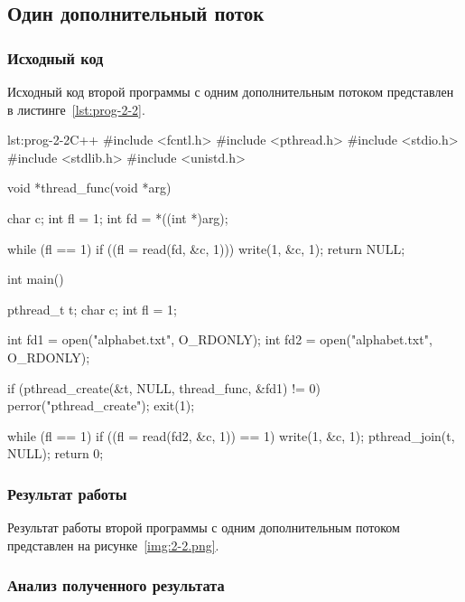 \subsection{Один дополнительный поток}
\subsubsection{Исходный код}
Исходный код второй программы с одним дополнительным потоком 
представлен в листинге~\ref{lst:prog-2-2}.

\begin{listing}{lst:prog-2-2}{C++}
#include <fcntl.h>
#include <pthread.h>
#include <stdio.h>
#include <stdlib.h>
#include <unistd.h>

void *thread_func(void *arg)
{
    char c;
    int fl = 1;
    int fd = *((int *)arg);

    while (fl == 1)
    {
        if ((fl = read(fd, &c, 1)))
            write(1, &c, 1);
    }
    return NULL;
}

int main()
{
    pthread_t t;
    char c;
    int fl = 1;

    int fd1 = open("alphabet.txt", O_RDONLY);
    int fd2 = open("alphabet.txt", O_RDONLY);

    if (pthread_create(&t, NULL, thread_func, &fd1) != 0)
    {
        perror("pthread_create");
        exit(1);
    }

    while (fl == 1)
    {
        if ((fl = read(fd2, &c, 1)) == 1)
            write(1, &c, 1);
    }
    pthread_join(t, NULL);
    return 0;
}
\end{listing}

\subsubsection{Результат работы}
Результат работы второй программы с одним дополнительным потоком 
представлен на рисунке~\ref{img:2-2.png}.

\subsubsection{Анализ полученного результата}

